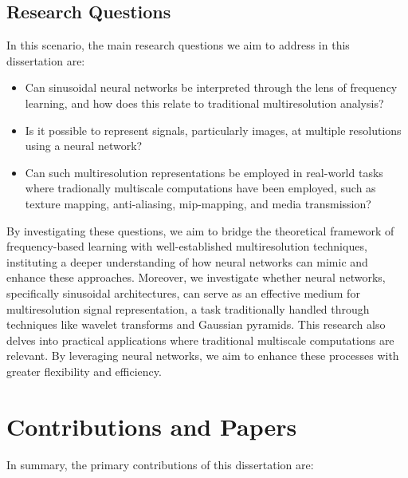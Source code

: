 \subsection{Research Questions}

In this scenario, the main research questions we aim to address in this dissertation are:

\begin{itemize}
    \item Can sinusoidal neural networks be interpreted through the lens of frequency learning, and how does this relate to traditional multiresolution analysis? 
    \item Is it possible to represent signals, particularly images, at multiple resolutions using a neural network?
    \item Can such multiresolution representations be employed in real-world tasks where tradionally multiscale computations have been employed, such as texture mapping, anti-aliasing, mip-mapping, and media transmission?
\end{itemize}  
  
By investigating these questions, we aim to bridge the theoretical framework of frequency-based learning with well-established multiresolution techniques, instituting a deeper understanding of how neural networks can mimic and enhance these approaches. Moreover, we investigate whether neural networks, specifically sinusoidal architectures, can serve as an effective medium for multiresolution signal representation, a task traditionally handled through techniques like wavelet transforms and Gaussian pyramids. This research also delves into practical applications where traditional multiscale computations are relevant. By leveraging neural networks, we aim to enhance these processes with greater flexibility and efficiency.


\section{Contributions and Papers}

In summary, the primary contributions of this dissertation are:

